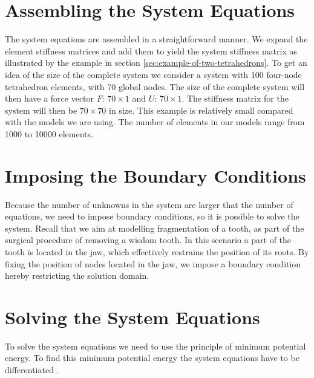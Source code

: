 \section{Assembling the System Equations}
The system equations are assembled in a straightforward manner. We
expand the element stiffness matrices and add them to yield the system
stiffness matrix as illustrated by the example in section
\vref{sec:example-of-two-tetrahedrons}.
To get an idea of the size of the complete system we consider a system
with 100 four-node tetrahedron elements, with 70 global nodes. The size
of the complete system will then have a force vector $F$: $70 \times
1$ and $U$: $70 \times 1$. The stiffness matrix for the system will
then be $70 \times 70$ in size.
%
This example is relatively small compared with the models we are
using. The number of elements in our models range from 1000 to 10000
elements.
%


\section{Imposing the Boundary Conditions}
Because the number of unknowns in the system are larger that the
number of equations, we need to impose boundary conditions, so it is
possible to solve the system.
%
Recall that we aim at modelling fragmentation of a tooth, as part of
the surgical procedure of removing a wisdom tooth. In this scenario 
a part of the tooth is located in the jaw, which effectively restrains
the position of its roots.
%
By fixing the position of nodes located in the jaw, we impose a
boundary condition hereby restricting the solution domain.

\section{Solving the System Equations}
To solve the system equations we need to use the principle of minimum
potential energy. To find this minimum potential energy the system
equations have to be differentiated .




